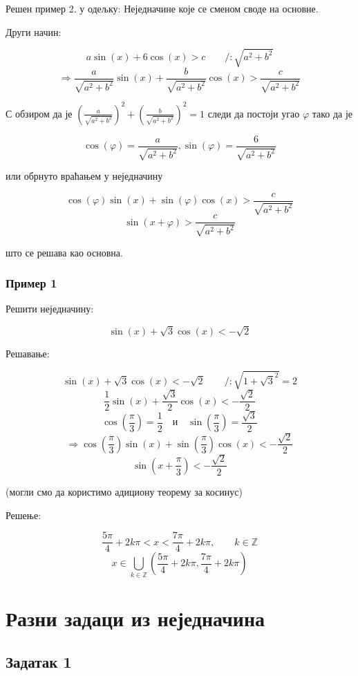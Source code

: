 \documentclass[a4paper,12pt]{article}
\begin{document}
Решен пример 2. у одељку: Неједначине које се сменом своде на основне.

Други начин:

\[a\sin(x)+6\cos(x)>c\qquad/:\sqrt{a^{2}+b^{2}}\]
\[\Rightarrow\frac{a}{\sqrt{a^{2}+b^{2}}}\sin(x)+\frac{b}{\sqrt{a^{2}+b^{2}}}\cos(x)>\frac{c}{\sqrt{a^{2}+b^{2}}}\]

С обзиром да је $\left(\frac{a}{\sqrt{a^{2}+b^{2}}}\right)^{2}+\left(\frac{b}{\sqrt{a^{2}+b^{2}}}\right)^{2}=1$
следи да постоји угао $\varphi$ тако да је

\[\cos(\varphi)=\frac{a}{\sqrt{a^{2}+b^{2}}},\sin(\varphi)=\frac{6}{\sqrt{a^{2}+b^{2}}}\]

или обрнуто враћањем у неједначину

\[\cos(\varphi)\sin(x)+\sin(\varphi)\cos(x)>\frac{c}{\sqrt{a^{2}+b^{2}}}\]
\[\sin(x+\varphi)>\frac{c}{\sqrt{a^{2}+b^{2}}}\]

што се решава као основна.

\subsubsection{Пример 1}

Решити неједначину:

\[\sin(x)+\sqrt{3}\cos(x)<-\sqrt{2}\]

Решавање:

\[\sin(x)+\sqrt{3}\cos(x)<-\sqrt{2}\qquad/:\sqrt{1+\sqrt{3}^{2}}=2\]
\[\frac{1}{2}\sin(x)+\frac{\sqrt{3}}{2}\cos(x)<-\frac{\sqrt{2}}{2}\]
\[\cos\left(\frac{\pi}{3}\right)=\frac{1}{2}\quad\text{и}\quad\sin\left(\frac{\pi}{3}\right)=\frac{\sqrt{3}}{2}\]
\[\Rightarrow\cos\left(\frac{\pi}{3}\right)\sin(x)+\sin\left(\frac{\pi}{3}\right)\cos(x)<-\frac{\sqrt{2}}{2}\]
\[\sin\left(x+\frac{\pi}{3}\right)<-\frac{\sqrt{2}}{2}\]

(могли смо да користимо адициону теорему за косинус)

Решење:

\[\frac{5\pi}{4}+2k\pi<x<\frac{7\pi}{4}+2k\pi,\qquad k\in\mathbb{Z}\]
\[x\in\bigcup_{k\in\mathbb{Z}}\left(\frac{5\pi}{4}+2k\pi,\frac{7\pi}{4}+2k\pi\right)\]


\section{Разни задаци из неједначина}

\subsection{Задатак 1}
\end{document}
